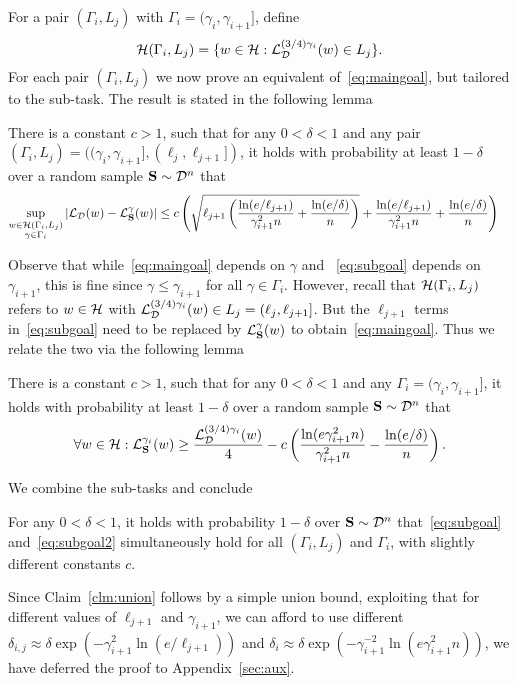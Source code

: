 For a pair $(\Gamma_i, L_j)$ with $\Gamma_i = (\gamma_i, \gamma_{i+1}]$, define
\[
\mathcal{H}(\Gamma_i,L_j) = \{ w \in \mathcal{H} : \mathcal{L}^{(3/4)\gamma_{i}}_{\mathcal{D}}(w) \in L_j \}.
\]
For each pair $(\Gamma_i,L_j)$ we now prove an equivalent of~\eqref{eq:maingoal}, but tailored to the sub-task. The result is stated in the following lemma
\begin{lemma}
\label{lem:subgoal}
There is a constant $c>1$, such that for any $0 < \delta < 1$ and any pair $(\Gamma_i, L_j) = ((\gamma_i, \gamma_{i+1}], (\ell_j, \ell_{j+1}])$, it holds with probability at least $1-\delta$ over a random sample $\mathbf{S} \sim \mathcal{D}^n$ that
\begin{align}
\sup_{\substack{w \in \mathcal{H}(\Gamma_i, L_j)\\\gamma \in \Gamma_i}} \left|\mathcal{L}_{\mathcal{D}}(w) - \mathcal{L}^{\gamma}_{\mathbf{S}}(w) \right| &\leq 
c \left(\sqrt{\ell_{j+1}\left( \frac{ \ln(e/\ell_{j+1})}{\gamma_{i+1}^2 n} + \frac{\ln(e/\delta)}{n} \right)} + \frac{\ln(e/\ell_{j+1})}{\gamma_{i+1}^2 n} + \frac{\ln(e/\delta)}{n} \right)\label{eq:subgoal}
\end{align}
\end{lemma}
Observe that while~\eqref{eq:maingoal} depends on $\gamma$ and ~\eqref{eq:subgoal} depends on $\gamma_{i+1}$, this is fine since $\gamma \leq \gamma_{i+1}$ for all $\gamma \in \Gamma_i$. However, recall that $\mathcal{H}(\Gamma_i,L_j)$ refers to $w \in \mathcal{H}$ with $\mathcal{L}_{\mathcal{D}}^{(3/4)\gamma_i}(w) \in L_j = (\ell_j,\ell_{j+1}]$. But the $\ell_{j+1}$ terms in~\eqref{eq:subgoal} need to be replaced by $\mathcal{L}^\gamma_{\mathbf{S}}(w)$ to obtain~\eqref{eq:maingoal}. Thus we relate the two via the following lemma
\begin{lemma}
\label{lem:subgoal2}
There is a constant $c>1$, such that for any $0 < \delta < 1$ and any $\Gamma_i = (\gamma_i, \gamma_{i+1}]$, it holds with probability at least $1-\delta$ over a random sample $\mathbf{S} \sim \mathcal{D}^n$ that
\begin{align}
\forall w \in \mathcal{H} : \mathcal{L}_{\mathbf{S}}^{\gamma_i}(w) \geq \frac{\mathcal{L}_{ \mathcal{D}}^{(3/4)\gamma_i}(w)}{4} - c \left(\frac{\ln(e\gamma_{i+1}^2 n)}{\gamma_{i+1}^2 n} - \frac{\ln(e/\delta)}{n}\right).\label{eq:subgoal2}
\end{align}
\end{lemma}
We combine the sub-tasks and conclude
\begin{claim}
\label{clm:union}
    For any $0 < \delta < 1$, it holds with probability $1-\delta$ over $\mathbf{S} \sim \mathcal{D}^n$ that~\eqref{eq:subgoal} and~\eqref{eq:subgoal2} simultaneously hold for all $(\Gamma_i,L_j)$ and $\Gamma_i$, with slightly different constants $c$.
\end{claim}
Since Claim~\ref{clm:union} follows by a simple union bound, exploiting that for different values of $\ell_{j+1}$ and $\gamma_{i+1}$, we can afford to use different $\delta_{i,j} \approx \delta \exp(-\gamma_{i+1}^2 \ln(e/\ell_{j+1}))$ and $\delta_i \approx \delta \exp(-\gamma_{i+1}^{-2} \ln(e \gamma^2_{i+1} n))$, we have deferred the proof to Appendix~\ref{sec:aux}.

